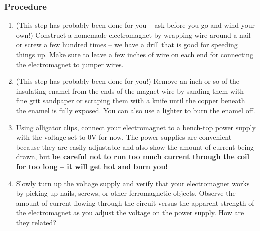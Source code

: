 \documentclass[11pt]{article} %
\begin{document}
%
%

\subsubsection*{Procedure}
\label{sec:electromagnet}

\begin{enumerate}
\item (This step has probably been done for you -- ask before you go and wind your own!) Construct a homemade electromagnet by wrapping wire around a nail or screw a few hundred times -- we have a drill that is good for speeding things up. Make sure to leave a few inches of wire on each end for connecting the electromagnet to jumper wires. 
\item (This step has probably been done for you!) Remove an inch or so of the insulating enamel from the ends of the magnet wire by sanding them with fine grit sandpaper or scraping them with a knife until the copper beneath the enamel is fully exposed. You can also use a lighter to burn the enamel off. 
\item Using alligator clips, connect your electromagnet to a bench-top power supply with the voltage set to 0V for now. The power supplies are convenient because they are easily adjustable and also show the amount of current being drawn, but {\bf be careful not to run too much current through the coil for too long -- it will get hot and burn you!} 
\item Slowly turn up the voltage supply and verify that your electromagnet works by picking up nails, screws, or other ferromagnetic objects. Observe the amount of current flowing through the circuit versus the apparent strength of the electromagnet as you adjust the voltage on the power supply. How are they related?
\end{enumerate}
\end{document}
